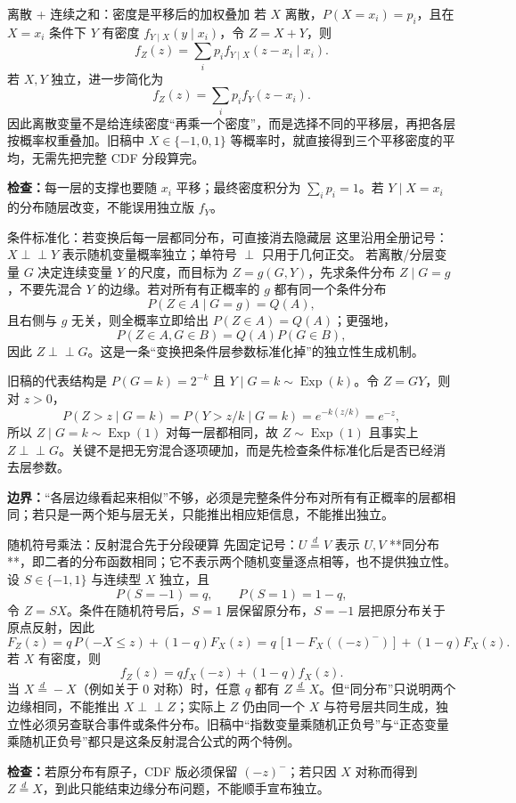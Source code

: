 \documentclass[11pt,a4paper]{ctexart}
\newcommand{\indep}{\mathrel{\perp\!\!\!\perp}}
\begin{document}
\begin{methodbox}{离散 + 连续之和：密度是平移后的加权叠加}
若 $X$ 离散，$P(X=x_i)=p_i$，且在 $X=x_i$ 条件下 $Y$ 有密度 $f_{Y\mid X}(y\mid x_i)$，令 $Z=X+Y$，则
\[
f_Z(z)=\sum_i p_i f_{Y\mid X}(z-x_i\mid x_i).
\]
若 $X,Y$ 独立，进一步简化为
\[
\boxed{f_Z(z)=\sum_i p_i f_Y(z-x_i)}.
\]
因此离散变量不是给连续密度“再乘一个密度”，而是选择不同的平移层，再把各层按概率权重叠加。旧稿中 $X\in\{-1,0,1\}$ 等概率时，就直接得到三个平移密度的平均，无需先把完整 CDF 分段算完。

\textbf{检查：}每一层的支撑也要随 $x_i$ 平移；最终密度积分为 $\sum_i p_i=1$。若 $Y\mid X=x_i$ 的分布随层改变，不能误用独立版 $f_Y$。
\end{methodbox}

\begin{methodbox}{条件标准化：若变换后每一层都同分布，可直接消去隐藏层}
这里沿用全册记号：$X\indep Y$ 表示随机变量概率独立；单符号 $\perp$ 只用于几何正交。
若离散/分层变量 $G$ 决定连续变量 $Y$ 的尺度，而目标为 $Z=g(G,Y)$，先求条件分布 $Z\mid G=g$，不要先混合 $Y$ 的边缘。若对所有有正概率的 $g$ 都有同一个条件分布
\[
P(Z\in A\mid G=g)=Q(A),
\]
且右侧与 $g$ 无关，则全概率立即给出 $P(Z\in A)=Q(A)$；更强地，
\[
P(Z\in A,G\in B)=Q(A)P(G\in B),
\]
因此 $Z\indep G$。这是一条“变换把条件层参数标准化掉”的独立性生成机制。

旧稿的代表结构是 $P(G=k)=2^{-k}$ 且 $Y\mid G=k\sim\operatorname{Exp}(k)$。令 $Z=GY$，则对 $z>0$，
\[
P(Z>z\mid G=k)=P(Y>z/k\mid G=k)=e^{-k(z/k)}=e^{-z},
\]
所以 $Z\mid G=k\sim\operatorname{Exp}(1)$ 对每一层都相同，故 $Z\sim\operatorname{Exp}(1)$ 且事实上 $Z\indep G$。关键不是把无穷混合逐项硬加，而是先检查条件标准化后是否已经消去层参数。

\textbf{边界：}“各层边缘看起来相似”不够，必须是完整条件分布对所有有正概率的层都相同；若只是一两个矩与层无关，只能推出相应矩信息，不能推出独立。
\end{methodbox}

\begin{methodbox}{随机符号乘法：反射混合先于分段硬算}
先固定记号：$U\overset{d}{=}V$ 表示 $U,V$ **同分布**，即二者的分布函数相同；它不表示两个随机变量逐点相等，也不提供独立性。设 $S\in\{-1,1\}$ 与连续型 $X$ 独立，且
\[
P(S=-1)=q,\qquad P(S=1)=1-q,
\]
令 $Z=SX$。条件在随机符号后，$S=1$ 层保留原分布，$S=-1$ 层把原分布关于原点反射，因此
\[
F_Z(z)=q\,P(-X\le z)+(1-q)F_X(z)
      =q\,[1-F_X((-z)^-)]+(1-q)F_X(z).
\]
若 $X$ 有密度，则
\[
\boxed{f_Z(z)=qf_X(-z)+(1-q)f_X(z)}.
\]
当 $X\overset{d}{=}-X$（例如关于 $0$ 对称）时，任意 $q$ 都有 $Z\overset{d}{=}X$。但“同分布”只说明两个边缘相同，不能推出 $X\indep Z$；实际上 $Z$ 仍由同一个 $X$ 与符号层共同生成，独立性必须另查联合事件或条件分布。旧稿中“指数变量乘随机正负号”与“正态变量乘随机正负号”都只是这条反射混合公式的两个特例。

\textbf{检查：}若原分布有原子，CDF 版必须保留 $(-z)^-$；若只因 $X$ 对称而得到 $Z\overset{d}{=}X$，到此只能结束边缘分布问题，不能顺手宣布独立。
\end{methodbox}
\end{document}
